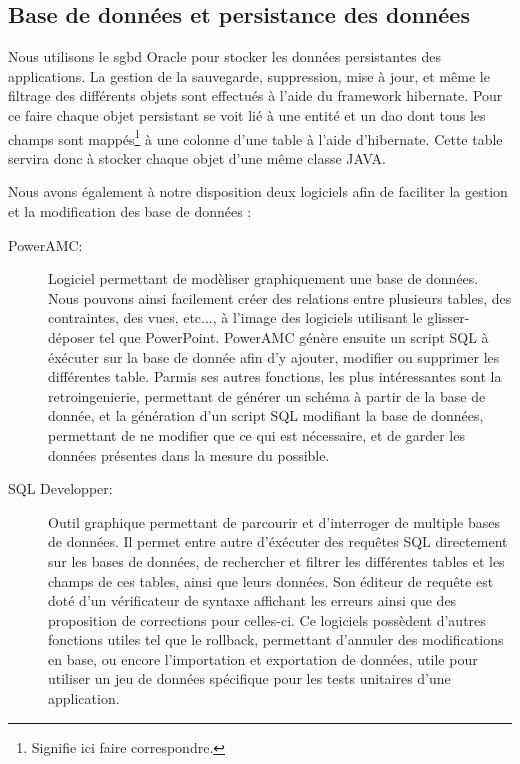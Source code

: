\documentclass[12pt]{report}
\begin{document}
    \newpage
    
    \subsection{Base de données et persistance des données}
    Nous utilisons le \gls{sgbd} Oracle pour stocker les données persistantes des applications. La gestion de la sauvegarde, suppression, mise à jour, et même le filtrage des différents objets sont effectués à l'aide du framework \gls{hibernate}. Pour ce faire chaque objet persistant se voit lié à une entité et un \gls{dao} dont tous les champs sont mappés\footnote{Signifie ici faire correspondre.} à une colonne d'une table à l'aide d'\gls{hibernate}. Cette table servira donc à stocker chaque objet d'une même classe JAVA.
    
    Nous avons également à notre disposition deux logiciels afin de faciliter la gestion et la modification des base de données :
    \begin{description}
        \item[PowerAMC: ]Logiciel permettant de modèliser graphiquement une base de données. Nous pouvons ainsi facilement créer des relations entre plusieurs tables, des contraintes, des vues, etc..., à l'image des logiciels utilisant le glisser-déposer tel que PowerPoint. PowerAMC génère ensuite un script SQL à éxécuter sur la base de donnée afin d'y ajouter, modifier ou supprimer les différentes table. Parmis ses autres fonctions, les plus intéressantes sont la \gls{retroingenierie}, permettant de générer un schéma à partir de la base de donnée, et la génération d'un script SQL modifiant la base de données, permettant de ne modifier que ce qui est nécessaire, et de garder les données présentes dans la mesure du possible.
        \item[SQL Developper: ]Outil graphique permettant de parcourir et d'interroger de multiple bases de données. Il permet entre autre d'éxécuter des requêtes SQL directement sur les bases de données, de rechercher et filtrer les différentes tables et les champs de ces tables, ainsi que leurs données. Son éditeur de requête est doté d'un vérificateur de syntaxe affichant les erreurs ainsi que des proposition de corrections pour celles-ci. Ce logiciels possèdent d'autres fonctions utiles tel que le rollback, permettant d'annuler des modifications en base, ou encore l'importation et exportation de données, utile pour utiliser un jeu de données spécifique pour les tests unitaires d'une application.
    \end{description}
    
\end{document}
